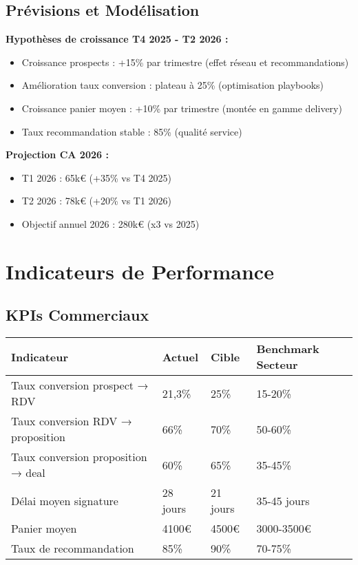 \subsection{Prévisions et Modélisation}

\textbf{Hypothèses de croissance T4 2025 - T2 2026 :}
\begin{itemize}
    \item Croissance prospects : +15\% par trimestre (effet réseau et recommandations)
    \item Amélioration taux conversion : plateau à 25\% (optimisation playbooks)
    \item Croissance panier moyen : +10\% par trimestre (montée en gamme delivery)
    \item Taux recommandation stable : 85\% (qualité service)
\end{itemize}

\textbf{Projection CA 2026 :}
\begin{itemize}
    \item T1 2026 : 65k€ (+35\% vs T4 2025)
    \item T2 2026 : 78k€ (+20\% vs T1 2026)
    \item Objectif annuel 2026 : 280k€ (x3 vs 2025)
\end{itemize}

\section{Indicateurs de Performance}

\subsection{KPIs Commerciaux}

\begin{longtable}{@{}p{5cm}p{3cm}p{3cm}p{3cm}@{}}
\toprule
\textbf{Indicateur} & \textbf{Actuel} & \textbf{Cible} & \textbf{Benchmark Secteur} \\
\midrule
Taux conversion prospect → RDV & 21,3\% & 25\% & 15-20\% \\
Taux conversion RDV → proposition & 66\% & 70\% & 50-60\% \\
Taux conversion proposition → deal & 60\% & 65\% & 35-45\% \\
Délai moyen signature & 28 jours & 21 jours & 35-45 jours \\
Panier moyen & 4100€ & 4500€ & 3000-3500€ \\
Taux de recommandation & 85\% & 90\% & 70-75\% \\
\bottomrule
\end{longtable}

